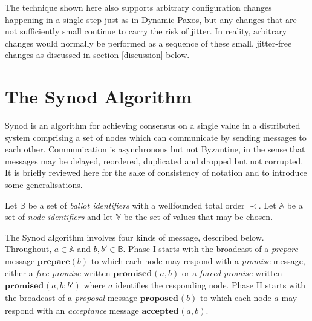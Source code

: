 \documentclass[journal]{IEEEtran}
\begin{document}
The technique shown here also supports arbitrary configuration changes
happening in a single step just as in Dynamic Paxos, but any changes that are
not sufficiently small continue to carry the risk of jitter. In reality,
arbitrary changes would normally be performed as a sequence of these small,
jitter-free changes as discussed in section \ref{discussion} below.

\section{The Synod Algorithm}

Synod\cite{part-time-parliament} is an algorithm for achieving consensus on a
single value in a distributed system comprising a set of nodes which can
communicate by sending messages to each other. Communication is asynchronous
but not Byzantine, in the sense that messages may be delayed, reordered,
duplicated and dropped but not corrupted. It is briefly reviewed here for the
sake of consistency of notation and to introduce some generalisations.

Let $\mathbb B$ be a set of \textit{ballot identifiers} with a wellfounded
total order $\prec$. Let $\mathbb A$ be a set of \textit{node identifiers} and
let $\mathbb V$ be the set of values that may be chosen.

\def\prep#1{\mathbf{prepare}(#1)}
\def\mprom#1#2#3{\mathbf{promised}_{\ge #1}(#2,#3)}
\def\fprom#1#2#3{\mathbf{promised}_{#1}(#2,#3)}
\def\bprom#1#2#3#4{\mathbf{promised}_{#1}(#2,#3;#4)}
\def\prop#1#2{\mathbf{proposed}_{#1}(#2)}
\def\acc#1#2#3{\mathbf{accepted}_{#1}(#2,#3)}
\def\chosen#1#2{\mathbf{chosen}_{#1}(#2)}
\def\owner#1{\mathrm{owner}(#1)}

The Synod algorithm involves four kinds of message, described below.
Throughout, $a \in \mathbb A$ and $b, b' \in \mathbb B$.  Phase I starts with
the broadcast of a \textit{prepare} message $\prep{b}$ to which each node may
respond with a \textit{promise} message, either a \textit{free promise} written
$\fprom{}{a}{b}$ or a \textit{forced promise} written $\bprom{}{a}{b}{b'}$
where $a$ identifies the responding node.  Phase II starts with the broadcast
of a \textit{proposal} message $\prop{}{b}$ to which each node $a$ may respond
with an \textit{acceptance} message $\acc{}{a}{b}$.
\end{document}
